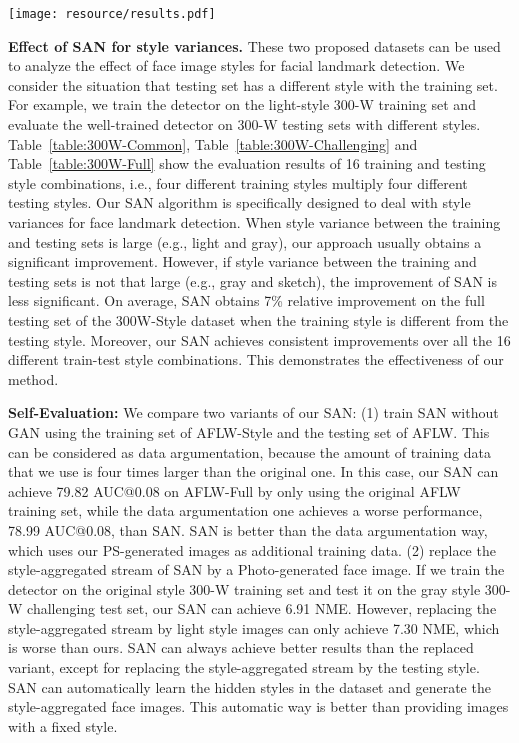 \documentclass[10pt,twocolumn,letterpaper]{article}
\begin{document}
\begin{figure*}[t]
\center
\texttt{[image: resource/results.pdf]}
\caption{Representative results on 300-W. The red points in the first line indicate the ground-truth landmarks.
The blue points in the second line and the green points in the third line indicate the landmark predictions from the base detector and SAN, respectively.
}
\vspace{-3mm}
\label{fig:results}
\end{figure*}





{\bf Effect of SAN for style variances.}
These two proposed datasets can be used to analyze the effect of face image styles for facial landmark detection.
We consider the situation that testing set has a different style with the training set.
For example, we train the detector on the light-style 300-W training set and evaluate the well-trained detector on 300-W testing sets with different styles.
Table~\ref{table:300W-Common}, Table~\ref{table:300W-Challenging} and Table~\ref{table:300W-Full} show the evaluation results of 16 training and testing style combinations, i.e., four different training styles multiply four different testing styles.
Our SAN algorithm is specifically designed to deal with style variances for face landmark detection.
When style variance between the training and testing sets is large (e.g., light and gray), our approach usually obtains a significant improvement.
However, if style variance between the training and testing sets is not that large (e.g., gray and sketch), the improvement of SAN is less significant.
On average, SAN obtains 7\% relative improvement on the full testing set of the 300W-Style dataset when the training style is different from the testing style.
Moreover, our SAN achieves consistent improvements over all the 16 different train-test style combinations.
This demonstrates the effectiveness of our method.


{\bf Self-Evaluation:}
We compare two variants of our SAN:
(1) train SAN without GAN using the training set of AFLW-Style and the testing set of AFLW.
This can be considered as data argumentation, because the amount of training data that we use is four times larger than the original one.
In this case, our SAN can achieve 79.82 AUC@0.08 on AFLW-Full by only using the original AFLW training set, while the data argumentation one achieves a worse performance, 78.99 AUC@0.08, than SAN.
SAN is better than the data argumentation way, which uses our PS-generated images as additional training data.
(2) replace the style-aggregated stream of SAN by a Photo-generated face image.
If we train the detector on the original style 300-W training set and test it on the gray style 300-W challenging test set, our SAN can achieve 6.91 NME.
However, replacing the style-aggregated stream by light style images can only achieve 7.30 NME, which is worse than ours.
SAN can always achieve better results than the replaced variant, except for replacing the style-aggregated stream by the testing style.
SAN can automatically learn the hidden styles in the dataset and generate the style-aggregated face images. This automatic way is better than providing images with a fixed style.
\end{document}
